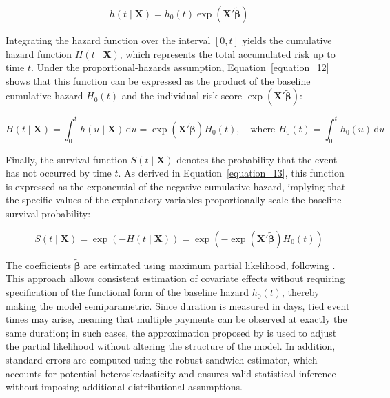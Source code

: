 \documentclass[12pt,a4paper]{article}
\providecommand{\textcite}{\citet}
\theoremstyle{plain}
\theoremstyle{definition}
\theoremstyle{remark}
\newcommand{\1}{\mathbf{1}}
\begin{document}
\begin{equation}
    h(t \mid \mathbf{X}) = h_0(t)\exp\left(\mathbf{X}'\tilde{\boldsymbol{\beta}}\right)
    \label{equation_11}
\end{equation}

Integrating the hazard function over the interval \([0,t]\) yields the cumulative hazard function \(H(t \mid \mathbf{X})\), which represents the total accumulated risk up to time \(t\). Under the proportional-hazards assumption, Equation~\ref{equation_12} shows that this function can be expressed as the product of the baseline cumulative hazard \(H_0(t)\) and the individual risk score \(\exp(\mathbf{X}'\tilde{\boldsymbol{\beta}})\):

\begin{equation}
    H(t \mid \mathbf{X}) = \int_0^t h(u \mid \mathbf{X})\, \mathrm{d}u
    = \exp\left(\mathbf{X}'\tilde{\boldsymbol{\beta}}\right) H_0(t),
    \quad \text{where }
    H_0(t) = \int_0^t h_0(u)\, \mathrm{d}u
    \label{equation_12}
\end{equation}

Finally, the survival function \(S(t \mid \mathbf{X})\) denotes the probability that the event has not occurred by time \(t\). As derived in Equation~\ref{equation_13}, this function is expressed as the exponential of the negative cumulative hazard, implying that the specific values of the explanatory variables proportionally scale the baseline survival probability:

\begin{equation}
    S(t \mid \mathbf{X}) = \exp\left( -H(t \mid \mathbf{X}) \right) = \exp\left( - \exp\left(\mathbf{X}'\tilde{\boldsymbol{\beta}}\right) H_0(t) \right)
    \label{equation_13}
\end{equation}

The coefficients \(\tilde{\boldsymbol{\beta}}\) are estimated using maximum partial likelihood, following \textcite{Cox1972}. This approach allows consistent estimation of covariate effects without requiring specification of the functional form of the baseline hazard \(h_0(t)\), thereby making the model semiparametric. Since duration is measured in days, tied event times may arise, meaning that multiple payments can be observed at exactly the same duration; in such cases, the approximation proposed by \textcite{Bradburn2003} is used to adjust the partial likelihood without altering the structure of the model. In addition, standard errors are computed using the robust sandwich estimator, which accounts for potential heteroskedasticity and ensures valid statistical inference without imposing additional distributional assumptions.
\end{document}
